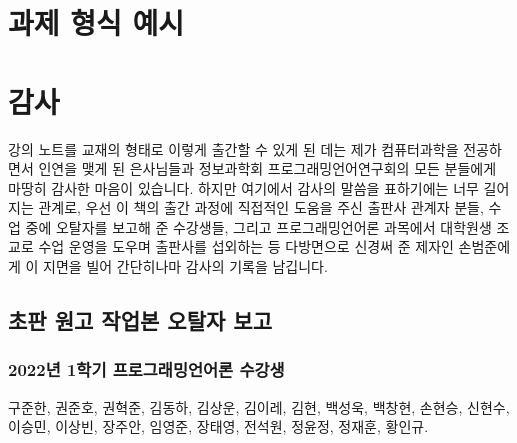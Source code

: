 \printbibliography[title=참고문헌]

\AppendixTitleToToc
\AttachAppendixTitleToSecnum

\appendix
\appendixpage*


\section{과제 형식 예시}


\newpage

\section{감사}
강의 노트를 교재의 형태로 이렇게 출간할 수 있게 된 데는 제가 컴퓨터과학을 전공하면서
인연을 맺게 된 은사님들과 정보과학회 프로그래밍언어연구회의 모든 분들에게 마땅히 감사한 마음이 있습니다.
하지만 여기에서 감사의 말씀을 표하기에는 너무 길어지는 관계로,
우선 이 책의 출간 과정에 직접적인 도움을 주신 출판사 관계자 분들,
수업 중에 오탈자를 보고해 준 수강생들, 그리고 프로그래밍언어론 과목에서
대학원생 조교로 수업 운영을 도우며 출판사를 섭외하는 등 다방면으로
신경써 준 제자인 손범준에게 이 지면을 빌어 간단히나마 감사의 기록을 남깁니다.

\subsection{초판 원고 작업본 오탈자 보고}
\subsubsection{2022년 1학기 프로그래밍언어론 수강생}
구준한,
권준호,
권혁준,
김동하,
김상운,
김이레,
김현,
백성욱,
백창현,
손현승,
신현수,
이승민,
이상빈,
장주안,
임영준,
장태영,
전석원,
정윤정,
정재훈,
황인규.

\begin{comment}
\newpage

\section{다음 판에 추가할지 고려중인 주제}
\subsection{Control}
Continuation-Passing Style,
Delimited Continuations,
Coroutines, Exceptions, Async-Await,
Algebraic Effects,
Functor/Applicative/Monad/Monoid/...

\url{https://www.microsoft.com/en-us/research/wp-content/uploads/2016/08/algeff-tr-2016-v2.pdf}

\subsection{Staged Computation}
Interpreter vs. Compiler, Futamura Projections, Partial Evaluation

\end{comment}


